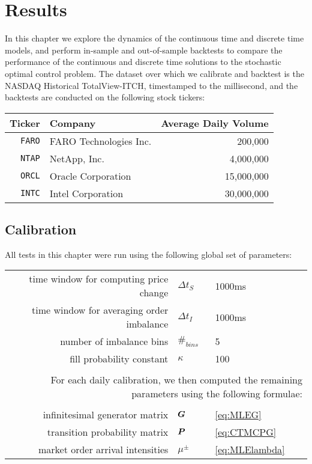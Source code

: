 %
%
%
%
\chapter{Results}

In this chapter we explore the dynamics of the continuous time and discrete time models, and perform in-sample and out-of-sample backtests to compare the performance of the continuous and discrete time solutions to the stochastic optimal control problem. The dataset over which we calibrate and backtest is the NASDAQ Historical TotalView-ITCH, timestamped to the millisecond, and the backtests are conducted on the following stock tickers:

\begin{table}[H]
\centering
{}
\begin{tabular}{@{} rlr @{}}
\toprule
Ticker & Company & Average Daily Volume \\
\midrule
\texttt{FARO} & FARO Technologies Inc. & 200,000 \\
\texttt{NTAP} & NetApp, Inc. & 4,000,000 \\
\texttt{ORCL} & Oracle Corporation & 15,000,000 \\
\texttt{INTC} & Intel Corporation & 30,000,000 \\
\bottomrule
\end{tabular}
\label{tbl:backtesttickers}
\end{table}

\section{Calibration}

All tests in this chapter were run using the following global set of parameters:
\begin{center}
\begin{tabular}{rll}
time window for computing price change & $\Delta t_S$ & 1000ms \\
time window for averaging order imbalance & $\Delta t_I$ & 1000ms \\
number of imbalance bins & $\#_{bins}$ & 5 \\
fill probability constant & $\kappa$ & 100 \\
&& \\
\multicolumn{3}{p{\linewidth}}{For each daily calibration, we then computed the remaining parameters using the following formulae:} \\
&& \\
infinitesimal generator matrix & $\boldsymbol{G}$ & \autoref{eq:MLEG} \\
transition probability matrix & $\boldsymbol{P}$ & \autoref{eq:CTMCPG} \\
market order arrival intensities & $\mu^\pm$ & \autoref{eq:MLElambda}
\end{tabular}
\end{center}

